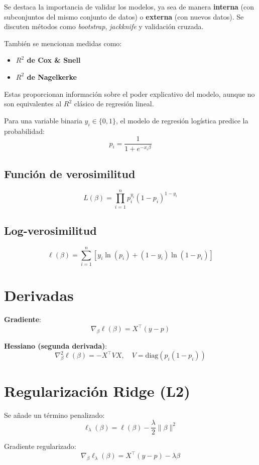 \documentclass[12pt]{article}
\begin{document}
\begin{itemize}
Se destaca la importancia de validar los modelos, ya sea de manera \textbf{interna} (con subconjuntos del mismo conjunto de datos) o \textbf{externa} (con nuevos datos). Se discuten m\'etodos como \textit{bootstrap}, \textit{jackknife} y validaci\'on cruzada.

Tambi\'en se mencionan medidas como:
\begin{itemize}
  \item \textbf{$R^2$ de Cox \& Snell}
  \item \textbf{$R^2$ de Nagelkerke}
\end{itemize}
Estas proporcionan informaci\'on sobre el poder explicativo del modelo, aunque no son equivalentes al $R^2$ cl\'asico de regresi\'on lineal.
\end{itemize}



Para una variable binaria $y_i \in \{0,1\}$, el modelo de regresión logística predice la probabilidad:
\[
p_i = \frac{1}{1 + e^{-x_i \beta}}
\]

\subsection*{Función de verosimilitud}
\[
L(\beta) = \prod_{i=1}^n p_i^{y_i} (1 - p_i)^{1 - y_i}
\]

\subsection*{Log-verosimilitud}
\[
\ell(\beta) = \sum_{i=1}^n \left[ y_i \ln(p_i) + (1 - y_i) \ln(1 - p_i) \right]
\]

\section*{Derivadas}

\textbf{Gradiente}:
\[
\nabla_\beta \ell(\beta) = X^\top (y - p)
\]

\textbf{Hessiano (segunda derivada)}:
\[
\nabla^2_\beta \ell(\beta) = - X^\top V X, \quad V = \text{diag}(p_i (1 - p_i))
\]

\section*{Regularización Ridge (L2)}
Se añade un término penalizado:
\[
\ell_\lambda(\beta) = \ell(\beta) - \frac{\lambda}{2} \|\beta\|^2
\]

Gradiente regularizado:
\[
\nabla_\beta \ell_\lambda(\beta) = X^\top (y - p) - \lambda \beta
\]
\end{document}
